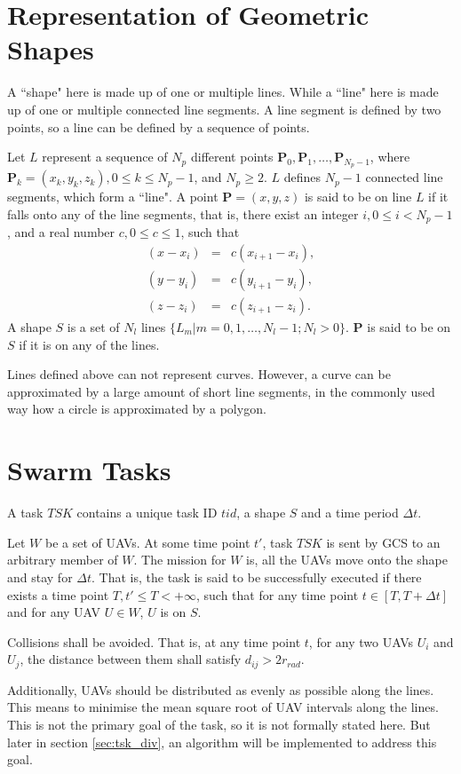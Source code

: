 \section{Representation of Geometric Shapes}

A ``shape" here is made up of one or multiple lines.
While a ``line" here is made up of one or multiple connected line segments.
A line segment is defined by two points,
so a line can be defined by a sequence of points.

Let $L$ represent a sequence of $N_p$ different points
$\bm{P}_0, \bm{P}_1, \ldots, \bm{P}_{N_p-1}$,
where $\bm{P}_k = (x_k, y_k, z_k), 0 \leqslant k \leqslant N_p-1$,
and $N_p \geqslant 2$.
$L$ defines $N_p - 1$ connected line segments, which form a ``line".
A point $\bm{P} = (x, y, z)$ is said to be on line $L$
if it falls onto any of the line segments,
that is, there exist an integer $i, 0 \leqslant i < N_p-1$,
and a real number $c, 0 \leqslant c \leqslant 1$, such that
\begin{eqnarray}
    (x - x_i) &=& c(x_{i+1} - x_i), \\
    (y - y_i) &=& c(y_{i+1} - y_i), \\
    (z - z_i) &=& c(z_{i+1} - z_i).
\end{eqnarray}
A shape $S$ is a set of $N_l$ lines $\{L_m | m = 0, 1, \ldots, N_l-1; N_l > 0\}$.
$\bm{P}$ is said to be on $S$ if it is on any of the lines.

Lines defined above can not represent curves.
However, a curve can be approximated by a large amount of short line segments,
in the commonly used way how a circle is approximated by a polygon.

\section{Swarm Tasks}
\label{sec:swm_tsk}

A task $TSK$ contains a unique task ID $tid$, a shape $S$ and a time period $\Delta t$.

Let $W$ be a set of UAVs.
At some time point $t'$,
task $TSK$ is sent by GCS to an arbitrary member of $W$.
The mission for $W$ is,
all the UAVs move onto the shape and stay for $\Delta t$.
That is, the task is said to be successfully executed
if there exists a time point $T, t' \leqslant T < +\infty$,
such that for any time point $t \in [T, T+\Delta t]$ and for any UAV $U \in W$,
$U$ is on $S$.

Collisions shall be avoided.
That is, at any time point $t$, for any two UAVs $U_i$ and $U_j$,
the distance between them shall satisfy $d_{ij} > 2 r_{rad}$.

Additionally, UAVs should be distributed as evenly as possible along the lines.
This means to minimise the mean square root of UAV intervals along the lines.
This is not the primary goal of the task, so it is not formally stated here.
But later in section \ref{sec:tsk_div},
an algorithm will be implemented to address this goal.